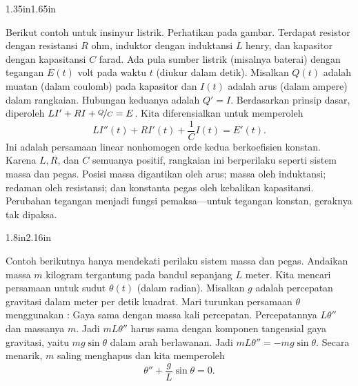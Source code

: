\begin{mywrapfigsimp}[5]{1.35in}{1.65in}
\noindent
{}
\end{mywrapfigsimp}
Berikut contoh untuk insinyur listrik. Perhatikan  pada gambar. Terdapat resistor dengan resistansi $R$ ohm, induktor dengan induktansi $L$ henry, dan kapasitor dengan kapasitansi $C$ farad. Ada pula sumber listrik (misalnya baterai) dengan tegangan $E(t)$ volt pada waktu $t$ (diukur dalam detik). Misalkan $Q(t)$ adalah muatan (dalam coulomb) pada kapasitor dan $I(t)$ adalah arus (dalam ampere) dalam rangkaian. Hubungan keduanya adalah $Q' = I$. Berdasarkan prinsip dasar, diperoleh $L I' + RI + \nicefrac{Q}{C} = E$. Kita diferensialkan untuk memperoleh
\begin{equation*}
L I''(t) + R I'(t) + \frac{1}{C} I(t) = E'(t) .
\end{equation*}
Ini adalah persamaan linear nonhomogen orde kedua berkoefisien konstan. Karena $L, R$, dan $C$ semuanya positif, rangkaian ini berperilaku seperti sistem massa dan pegas. Posisi massa digantikan oleh arus; massa oleh induktansi; redaman oleh resistansi; dan konstanta pegas oleh kebalikan kapasitansi. Perubahan tegangan menjadi fungsi pemaksa---untuk tegangan konstan, geraknya tak dipaksa.

\medskip

\begin{mywrapfigsimp}[9]{1.8in}{2.16in}
\noindent
{}
\end{mywrapfigsimp}
Contoh berikutnya hanya mendekati perilaku sistem massa dan pegas. Andaikan massa $m$ kilogram tergantung pada bandul sepanjang $L$ meter. Kita mencari persamaan untuk sudut $\theta(t)$ (dalam radian). Misalkan $g$ adalah percepatan gravitasi dalam meter per detik kuadrat. Mari turunkan persamaan $\theta$ menggunakan : Gaya sama dengan massa kali percepatan. Percepatannya $L \theta''$ dan massanya $m$. Jadi $mL\theta''$ harus sama dengan komponen tangensial gaya gravitasi, yaitu $m g \sin \theta$ dalam arah berlawanan. Jadi $mL\theta'' = -mg \sin \theta$. Secara menarik, $m$ saling menghapus dan kita memperoleh
\begin{equation*}
\theta'' + \frac{g}{L} \sin \theta = 0 .
\end{equation*}

